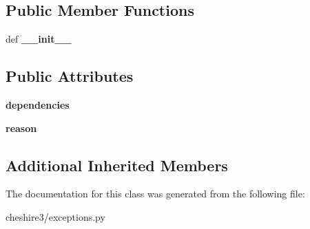 \subsection*{Public Member Functions}
\begin{DoxyCompactItemize}
\item 
\hypertarget{classcheshire3_1_1exceptions_1_1_missing_dependency_exception_a96be1a488652f453e46e48a21763a19f}{def {\bfseries \-\_\-\-\_\-init\-\_\-\-\_\-}}\label{classcheshire3_1_1exceptions_1_1_missing_dependency_exception_a96be1a488652f453e46e48a21763a19f}

\end{DoxyCompactItemize}
\subsection*{Public Attributes}
\begin{DoxyCompactItemize}
\item 
\hypertarget{classcheshire3_1_1exceptions_1_1_missing_dependency_exception_a5b9cc384b172feebb2368c5cb56f43ba}{{\bfseries dependencies}}\label{classcheshire3_1_1exceptions_1_1_missing_dependency_exception_a5b9cc384b172feebb2368c5cb56f43ba}

\item 
\hypertarget{classcheshire3_1_1exceptions_1_1_missing_dependency_exception_ab6e8399a69b833e4b853fd60b701d873}{{\bfseries reason}}\label{classcheshire3_1_1exceptions_1_1_missing_dependency_exception_ab6e8399a69b833e4b853fd60b701d873}

\end{DoxyCompactItemize}
\subsection*{Additional Inherited Members}


The documentation for this class was generated from the following file\-:\begin{DoxyCompactItemize}
\item 
cheshire3/exceptions.\-py\end{DoxyCompactItemize}
